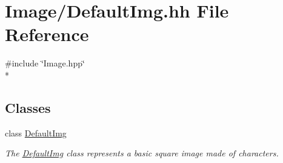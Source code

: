 \hypertarget{DefaultImg_8hh}{\section{Image/\-Default\-Img.hh File Reference}
\label{DefaultImg_8hh}
}
{\ttfamily \#include \char`\"{}Image.\-hpp\char`\"{}}\\*
\subsection*{Classes}
\begin{DoxyCompactItemize}
\item 
class \hyperlink{classDefaultImg}{Default\-Img}
\begin{DoxyCompactList}\small\item\em The \hyperlink{classDefaultImg}{Default\-Img} class represents a basic square image made of characters. \end{DoxyCompactList}\end{DoxyCompactItemize}

